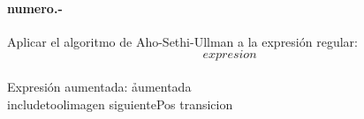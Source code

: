

\paragraph{{numero}.-}\label{p{numero}}
Aplicar el algoritmo de Aho-Sethi-Ullman a la expresión regular:
\[
    {expresion}
\]
~\\
Expresión aumentada: \h{{aumentada}} \\

{includetool}{{imagen}}
{siguientePos}
\quad
{transicion}
